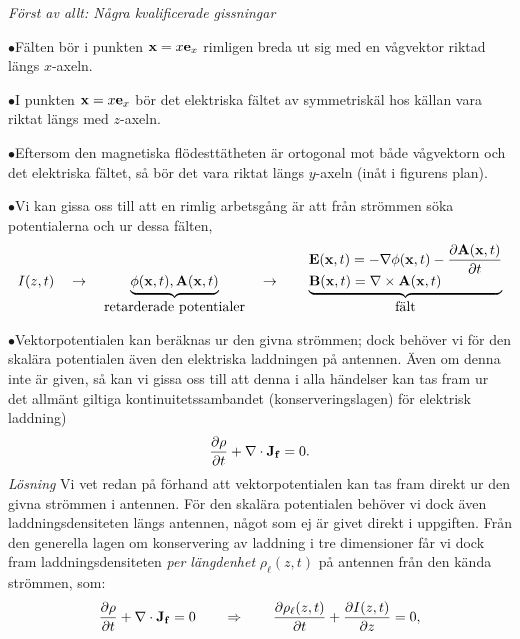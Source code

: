 \noindent
{\it F{\"o}rst av allt: N{\aa}gra kvalificerade gissningar}
\smallskip
\noindent
\item{$\bullet$}{F{\"a}lten b{\"o}r i punkten ${\bf x}=x{\bf e}_x$ rimligen
    breda ut sig med en v{\aa}gvektor riktad l{\"a}ngs $x$-axeln.}
\item{$\bullet$}{I punkten ${\bf x}=x{\bf e}_x$ b{\"o}r det elektriska
    f{\"a}ltet av symmetrisk{\"a}l hos k{\"a}llan vara riktat l{\"a}ngs
    med $z$-axeln.}
\item{$\bullet$}{Eftersom den magnetiska fl{\"o}destt{\"a}theten {\"a}r
    ortogonal mot b{\aa}de v{\aa}gvektorn och det elektriska f{\"a}ltet,
    s{\aa} b{\"o}r det vara riktat l{\"a}ngs $y$-axeln (in{\aa}t i figurens
    plan).}
\item{$\bullet$}{Vi kan gissa oss till att en rimlig arbetsg{\aa}ng {\"a}r
    att fr{\aa}n str{\"o}mmen s{\"o}ka potentialerna och ur dessa f{\"a}lten,
    $$
      I(z,t)\quad\to\quad
      \underbrace{\phi({\bf x},t),{\bf A}({\bf x},t)}_{\hbox{retarderade
          potentialer}}
      \quad\to\qquad
      \underbrace{
        \vbox{
          \hbox{$\displaystyle
	    {\bf E}({\bf x},t)=-\nabla\phi({\bf x},t)
	        -{{\partial{\bf A}({\bf x},t)}\over{\partial t}}$}
          \hbox{$\displaystyle
	    {\bf B}({\bf x},t)=\nabla\times{\bf A}({\bf x},t)$}
	}
      }_{\hbox{f{\"a}lt}}
    $$}
\item{$\bullet$}{Vektorpotentialen kan ber{\"a}knas ur den givna str{\"o}mmen;
    dock beh{\"o}ver vi f{\"o}r den skal{\"a}ra potentialen {\"a}ven den
    elektriska laddningen p{\aa} antennen. {\"A}ven om denna inte {\"a}r
    given, s{\aa} kan vi gissa oss till att denna i alla h{\"a}ndelser kan
    tas fram ur det allm{\"a}nt giltiga kontinuitetssambandet
    (konserveringslagen) f{\"o}r elektrisk laddning)
    $$
      {{\partial\rho}\over{\partial t}}+\nabla\cdot{\bf J}_{\bf f}=0.
    $$}
\vfill\eject
\noindent
{\it L{\"o}sning}
\smallskip
\noindent
Vi vet redan p{\aa} f{\"o}rhand att vektorpotentialen kan tas fram direkt ur
den givna str{\"o}mmen i antennen. F{\"o}r den skal{\"a}ra potentialen
beh{\"o}ver vi dock {\"a}ven laddningsdensiteten l{\"a}ngs antennen, n{\aa}got
som ej {\"a}r givet direkt i uppgiften. Fr{\aa}n den generella lagen om
konservering av laddning i tre dimensioner f{\aa}r vi dock fram
laddningsdensiteten {\it per l{\"a}ngdenhet} $\rho_{\ell}(z,t)$ p{\aa}
antennen fr{\aa}n den k{\"a}nda str{\"o}mmen, som:
$$
  {{\partial\rho}\over{\partial t}}+\nabla\cdot{\bf J}_{\bf f}=0
    \qquad\Rightarrow\qquad
  {{\partial\rho_{\ell}(z,t)}\over{\partial t}}
    +{{\partial I(z,t)}\over{\partial z}}=0,
$$
